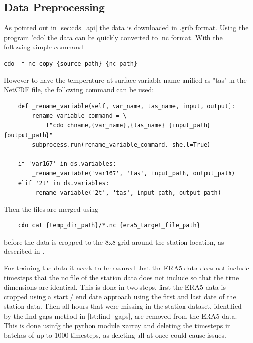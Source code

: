 \subsection{Data Preprocessing}

As pointed out in \autoref{sec:cds_api} the data is downloaded in .grib format. Using the program 'cdo' the data can be quickly converted to .nc format. With the following simple command

\begin{lstlisting}
cdo -f nc copy {source_path} {nc_path}
\end{lstlisting}

However to have the temperature at surface variable name unified as "tas" in the NetCDF file, the following command can be used:

\begin{lstlisting}
    def _rename_variable(self, var_name, tas_name, input, output):
        rename_variable_command = \
            f"cdo chname,{var_name},{tas_name} {input_path} {output_path}"
        subprocess.run(rename_variable_command, shell=True)

    if 'var167' in ds.variables:
        _rename_variable('var167', 'tas', input_path, output_path)
    elif '2t' in ds.variables:
        _rename_variable('2t', 'tas', input_path, output_path)

\end{lstlisting}

Then the files are merged using 

\begin{lstlisting}
    cdo cat {temp_dir_path}/*.nc {era5_target_file_path}
\end{lstlisting}

before the data is cropped to the 8x8 grid around the station location, as described in .

For training the data it needs to be assured that the ERA5 data does not include timesteps that the nc file of the station data does not include so that the time dimensions are identical. This is done in two steps, first the ERA5 data is cropped using a start / end date approach using the first and last date of the station data. Then all hours that were missing in the station dataset, identified by the find gaps method in \autoref{lst:find_gaps}, are removed from the ERA5 data. This is done usinfg the python module xarray and deleting the timesteps in batches of up to 1000 timesteps, as deleting all at once could cause issues.

